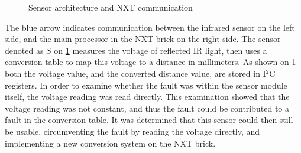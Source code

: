 \begin{figure}[H]
\begin{center}
\end{center}
\caption{Sensor architecture and NXT communication}
\label{fig:hwArc}
\end{figure}

The blue arrow indicates communication between the infrared sensor on the left side, and the main processor in the NXT brick on the right side. The sensor denoted as $S$ on \cref{fig:hwArc} measures the voltage of reflected IR light, then uses a conversion table to map this voltage to a distance in millimeters. As shown on \cref{fig:hwArc} both the voltage value, and the converted distance value, are stored in I$^2$C registers. In order to examine whether the fault was within the sensor module itself, the voltage reading was read directly. This examination showed that the voltage reading was not constant, and thus the fault could be contributed to a fault in the conversion table. It was determined that this sensor could then still be usable, circumventing the fault by reading the voltage directly, and implementing a new conversion system on the NXT brick. \\


